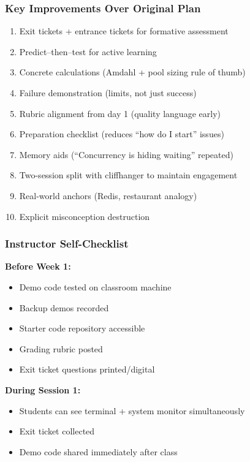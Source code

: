 \documentclass[11pt,a4paper]{article}
\begin{document}
\subsubsection*{Key Improvements Over Original Plan}

\begin{enumerate}[leftmargin=*]
\item Exit tickets + entrance tickets for formative assessment
\item Predict--then--test for active learning
\item Concrete calculations (Amdahl + pool sizing rule of thumb)
\item Failure demonstration (limits, not just success)
\item Rubric alignment from day 1 (quality language early)
\item Preparation checklist (reduces ``how do I start'' issues)
\item Memory aids (``Concurrency is hiding waiting'' repeated)
\item Two-session split with cliffhanger to maintain engagement
\item Real-world anchors (Redis, restaurant analogy)
\item Explicit misconception destruction
\end{enumerate}

\subsubsection*{Instructor Self-Checklist}

\textbf{Before Week 1:}
\begin{itemize}[leftmargin=*]
\item[$\square$] Demo code tested on classroom machine
\item[$\square$] Backup demos recorded
\item[$\square$] Starter code repository accessible
\item[$\square$] Grading rubric posted
\item[$\square$] Exit ticket questions printed/digital
\end{itemize}

\textbf{During Session 1:}
\begin{itemize}[leftmargin=*]
\item[$\square$] Students can see terminal + system monitor simultaneously
\item[$\square$] Exit ticket collected
\item[$\square$] Demo code shared immediately after class
\end{itemize}
\end{document}
